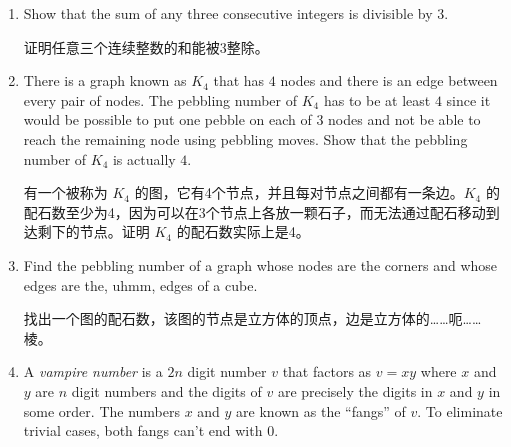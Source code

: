 \begin{enumerate}
  \wbvfill
  
  \workbookpagebreak
  
  \item Show that the sum of any three consecutive integers is divisible
  by 3.
  
  证明任意三个连续整数的和能被3整除。
  
  
  \wbvfill
  
  \item There is a graph known as $K_4$ that has $4$ nodes and there is an edge between every pair of nodes.
  The pebbling number of $K_4$ has to be at least $4$ since it would be possible to put one pebble on each of
  $3$ nodes and not be able to reach the remaining node using pebbling moves.
  Show that the pebbling number of $K_4$ is actually $4$.
  
  有一个被称为 $K_4$ 的图，它有4个节点，并且每对节点之间都有一条边。$K_4$ 的配石数至少为4，因为可以在3个节点上各放一颗石子，而无法通过配石移动到达剩下的节点。证明 $K_4$ 的配石数实际上是4。
  
  \wbvfill
  
  \workbookpagebreak
  
  \item Find the pebbling number of a graph whose nodes are the corners and 
  whose edges are the, uhmm, edges of a cube.
  
  找出一个图的配石数，该图的节点是立方体的顶点，边是立方体的……呃……棱。
  
  \wbvfill
  
  \item A \emph{vampire number} is a $2n$ digit number $v$ that factors as $v=xy$
  where $x$ and $y$ are $n$ digit numbers and the digits of $v$ are precisely the digits in $x$ and $y$ in some order.
  The numbers $x$ and $y$
  are known as the ``fangs'' of $v$.
  To eliminate trivial
  cases, both fangs can't end with 0.  
  

\end{enumerate}
